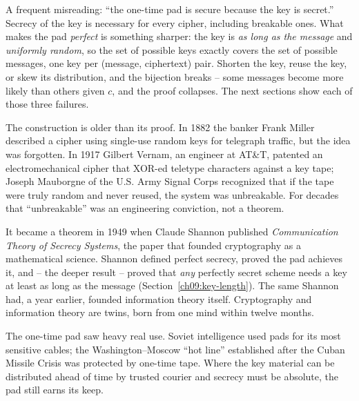 \begin{trapbox}
A frequent misreading: ``the one-time pad is secure because the key is secret.'' Secrecy of the key is necessary for every cipher, including breakable ones. What makes the pad \emph{perfect} is something sharper: the key is \emph{as long as the message} and \emph{uniformly random}, so the set of possible keys exactly covers the set of possible messages, one key per (message, ciphertext) pair. Shorten the key, reuse the key, or skew its distribution, and the bijection breaks -- some messages become more likely than others given $c$, and the proof collapses. The next sections show each of those three failures.
\end{trapbox}

\begin{historybox}
The construction is older than its proof. In 1882 the banker Frank Miller described a cipher using single-use random keys for telegraph traffic, but the idea was forgotten. In 1917 Gilbert Vernam, an engineer at AT\&T, patented an electromechanical cipher that XOR-ed teletype characters against a key tape; Joseph Mauborgne of the U.S. Army Signal Corps recognized that if the tape were truly random and never reused, the system was unbreakable. For decades that ``unbreakable'' was an engineering conviction, not a theorem.

It became a theorem in 1949 when Claude Shannon published \emph{Communication Theory of Secrecy Systems}, the paper that founded cryptography as a mathematical science. Shannon defined perfect secrecy, proved the pad achieves it, and -- the deeper result -- proved that \emph{any} perfectly secret scheme needs a key at least as long as the message (Section~\ref{ch09:key-length}). The same Shannon had, a year earlier, founded information theory itself. Cryptography and information theory are twins, born from one mind within twelve months.

The one-time pad saw heavy real use. Soviet intelligence used pads for its most sensitive cables; the Washington--Moscow ``hot line'' established after the Cuban Missile Crisis was protected by one-time tape. Where the key material can be distributed ahead of time by trusted courier and secrecy must be absolute, the pad still earns its keep.
\end{historybox}

